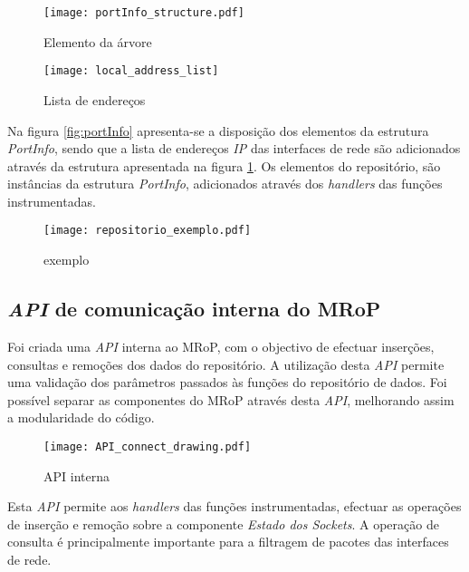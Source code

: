 \begin{figure}[ht]
\begin{minipage}[b]{0.5\linewidth}
\centering
\texttt{[image: portInfo\_structure.pdf]}
\caption{Elemento da árvore}
\label{fig:portInfo}
\end{minipage}
\hspace{0.5cm}
\begin{minipage}[b]{0.5\linewidth}
\centering
\texttt{[image: local\_address\_list]}
\caption{Lista de endereços}
\label{fig:local_address_list}
\end{minipage}
\end{figure}

Na figura \ref{fig:portInfo} apresenta-se a disposição dos elementos da estrutura \textit{PortInfo}, sendo que a lista de endereços \textit{IP} das interfaces de rede são adicionados através da estrutura apresentada na figura \ref{fig:local_address_list}.
Os elementos do repositório, são instâncias da estrutura \textit{PortInfo}, adicionados através dos \textit{handlers} das funções instrumentadas.

\begin{figure}[ht]
\centering
\texttt{[image: repositorio\_exemplo.pdf]}
\caption{exemplo}
\label{fig:repo_example}
\end{figure}

\subsection{\textit{API} de comunicação interna do MRoP}
\label{sub:repo_api}

Foi criada uma \textit{API} interna ao MRoP, com o objectivo de efectuar inserções, consultas e remoções dos dados do repositório.
A utilização desta \textit{API} permite uma validação dos parâmetros passados às funções do repositório de dados.
Foi possível separar as componentes do MRoP através desta \textit{API}, melhorando assim a modularidade do código.

\begin{figure}[ht]
\centering
\texttt{[image: API\_connect\_drawing.pdf]}
\caption{API interna}
\label{fig:api_connect}
\end{figure}

Esta \textit{API} permite aos \textit{handlers} das funções instrumentadas, efectuar as operações de inserção e remoção sobre a componente \textit{Estado dos Sockets}.
A operação de consulta é principalmente importante para a filtragem de pacotes das interfaces de rede.

